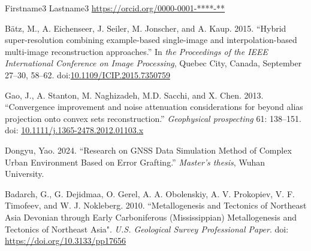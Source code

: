 \documentclass[12pt]{gsis}  %
\begin{document}
\noindent Firstname3 Lastname3    \quad     \url{https://orcid.org/0000-0001-****-**}



\begin{thebibliography}{}

B{\"a}tz, M., A. Eichenseer, J. Seiler, M. Jonscher, and
  A. Kaup. 2015. ``Hybrid super-resolution combining example-based
  single-image and interpolation-based multi-image reconstruction approaches.''
  In \emph{the Proceedings of the IEEE International Conference on Image
  Processing}, Quebec City, Canada, September 27–30, 58--62. doi:\url{10.1109/ICIP.2015.7350759}


Gao, J., A. Stanton, M. Naghizadeh, M.D. Sacchi, and
  X. Chen. 2013. ``Convergence improvement and noise attenuation
  considerations for beyond alias projection onto convex sets reconstruction.''
  \emph{Geophysical prospecting} 61: 138--151. doi: \url{10.1111/j.1365-2478.2012.01103.x}

Dongyu, Yao. 2024. ``Research on GNSS Data Simulation Method of Complex Urban Environment Based
on Error Grafting.” \emph{Master’s thesis}, Wuhan University.

Badarch, G., G. Dejidmaa, O. Gerel, A. A. Obolenskiy, A. V. Prokopiev, V. F. Timofeev, and W. J. Nokleberg. 2010. ``Metallogenesis and Tectonics of Northeast Asia Devonian through Early Carboniferous (Mississippian) Metallogenesis and Tectonics of Northeast Asia". \emph{U.S. Geological Survey Professional Paper}. doi: \url{https://doi.org/10.3133/pp17656}

\end{thebibliography}



\end{document}
